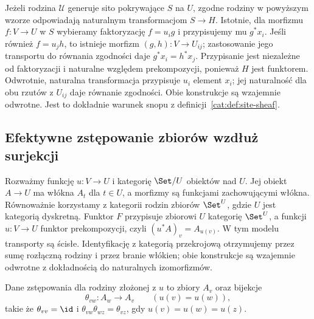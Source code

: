 Jeżeli rodzina $\mathcal U$ generuje sito pokrywające $S$ na $U$, zgodne rodziny w powyższym wzorze odpowiadają naturalnym transformacjom $S\to H$. Istotnie, dla morfizmu $f:V\to U$ w $S$ wybieramy faktoryzację $f=u_i g$ i przypisujemy mu $g^*x_i$. Jeśli również $f=u_jh$, to istnieje morfizm $(g,h):V\to U_{ij}$; zastosowanie jego transportu do równania zgodności daje $g^*x_i=h^*x_j$. Przypisanie jest niezależne od faktoryzacji i naturalne względem prekompozycji, ponieważ $H$ jest funktorem. Odwrotnie, naturalna transformacja przypisuje $u_i$ element $x_i$; jej naturalność dla obu rzutów z $U_{ij}$ daje równanie zgodności. Obie konstrukcje są wzajemnie odwrotne. Jest to dokładnie warunek snopu z definicji~\ref{cat:def:site-sheaf}.

\subsection{Efektywne zstępowanie zbiorów wzdłuż surjekcji}

Rozważmy funkcję $u:V\to U$ i kategorię $\Set/U$ obiektów nad $U$. Jej obiekt $A\to U$ ma włókna $A_t$ dla $t\in U$, a morfizmy są funkcjami zachowującymi włókna. Równoważnie korzystamy z kategorii rodzin zbiorów $\Set^U$, gdzie $U$ jest kategorią dyskretną. Funktor $F$ przypisuje zbiorowi $U$ kategorię $\Set^U$, a funkcji $u:V\to U$ funktor prekompozycji, czyli $(u^*A)_v=A_{u(v)}$. W tym modelu transporty są ścisłe. Identyfikację z kategorią przekrojową otrzymujemy przez sumę rozłączną rodziny i przez branie włókien; obie konstrukcje są wzajemnie odwrotne z dokładnością do naturalnych izomorfizmów.

Dane zstępowania dla rodziny złożonej z $u$ to zbiory $A_v$ oraz bijekcje
\[
 \theta_{vw}:A_w\longrightarrow A_v
 \qquad(u(v)=u(w)),
\]
takie że $\theta_{vv}=\id$ i $\theta_{vw}\theta_{wz}=\theta_{vz}$, gdy $u(v)=u(w)=u(z)$.

